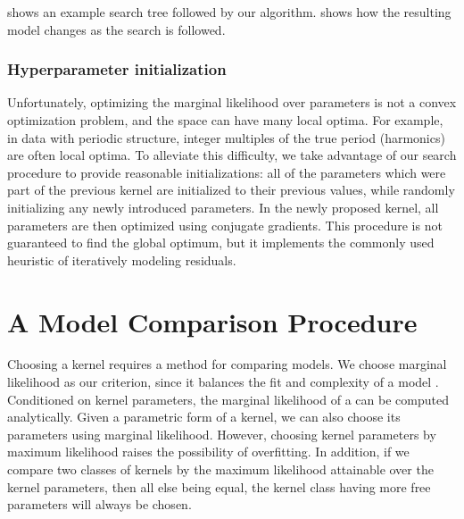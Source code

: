  shows an example search tree followed by our algorithm.
 shows how the resulting model changes as the search is followed.

\subsubsection{Hyperparameter initialization}

Unfortunately, optimizing the marginal likelihood over parameters is not a convex optimization problem, and the space can have many local optima.
For example, in data with periodic structure, integer multiples of the true period (harmonics) are often local optima. 
To alleviate this difficulty, we take advantage of our search procedure to provide reasonable initializations: all of the parameters which were part of the previous kernel are initialized to their previous values, while randomly initializing any newly introduced parameters.
In the newly proposed kernel, all parameters are then optimized using conjugate gradients.
This procedure is not guaranteed to find the global optimum, but it implements the commonly used heuristic of iteratively modeling residuals.







\section{A Model Comparison Procedure}

Choosing a kernel requires a method for comparing models.
We choose marginal likelihood as our criterion, since it balances the fit and complexity of a model \citep{rasmussen2001occam}.
Conditioned on kernel parameters, the marginal likelihood of a \gp{} can be computed analytically.
Given a parametric form of a kernel, we can also choose its parameters using marginal likelihood.
However, choosing kernel parameters by maximum likelihood raises the possibility of overfitting.
In addition, if we compare two classes of kernels by the maximum likelihood attainable over the kernel parameters, then all else being equal, the kernel class having more free parameters will always be chosen.

